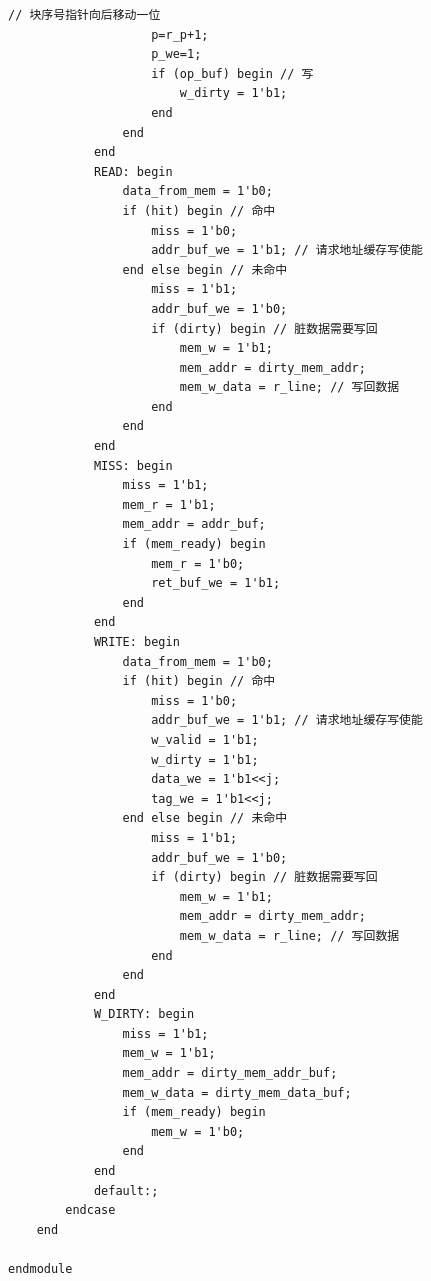 \documentclass[12pt,a4paper]{ctexart}
\begin{document}
\begin{lstlisting}[style=verilog]
                    // 块序号指针向后移动一位
                    p=r_p+1;
                    p_we=1;
                    if (op_buf) begin // 写
                        w_dirty = 1'b1;
                    end 
                end
            end
            READ: begin
                data_from_mem = 1'b0;
                if (hit) begin // 命中
                    miss = 1'b0;
                    addr_buf_we = 1'b1; // 请求地址缓存写使能
                end else begin // 未命中
                    miss = 1'b1;
                    addr_buf_we = 1'b0; 
                    if (dirty) begin // 脏数据需要写回
                        mem_w = 1'b1;
                        mem_addr = dirty_mem_addr;
                        mem_w_data = r_line; // 写回数据
                    end
                end
            end
            MISS: begin
                miss = 1'b1;
                mem_r = 1'b1;
                mem_addr = addr_buf;
                if (mem_ready) begin
                    mem_r = 1'b0;
                    ret_buf_we = 1'b1;
                end 
            end 
            WRITE: begin
                data_from_mem = 1'b0;
                if (hit) begin // 命中
                    miss = 1'b0;
                    addr_buf_we = 1'b1; // 请求地址缓存写使能
                    w_valid = 1'b1;
                    w_dirty = 1'b1;
                    data_we = 1'b1<<j;
                    tag_we = 1'b1<<j;
                end else begin // 未命中
                    miss = 1'b1;
                    addr_buf_we = 1'b0; 
                    if (dirty) begin // 脏数据需要写回
                        mem_w = 1'b1;
                        mem_addr = dirty_mem_addr;
                        mem_w_data = r_line; // 写回数据
                    end
                end
            end
            W_DIRTY: begin
                miss = 1'b1;
                mem_w = 1'b1;
                mem_addr = dirty_mem_addr_buf;
                mem_w_data = dirty_mem_data_buf;
                if (mem_ready) begin
                    mem_w = 1'b0;
                end
            end
            default:;
        endcase
    end

endmodule
\end{lstlisting}
\end{document}
